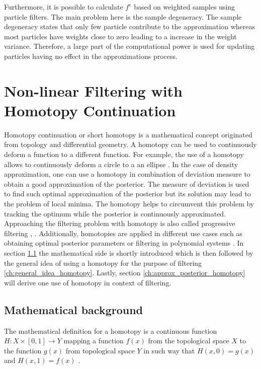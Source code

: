 \documentclass[a4paper]{IEEEtran}
\begin{document}
Furthermore, it is possible to calculate $f^{e}$ based on weighted samples using particle filters. The main problem here is the sample degeneracy. The sample degeneracy states that only few particle contribute to the approximation whereas most particles 
have weights close to zero \cite{arulampalam2002} leading to a increase in the weight variance. Therefore, a large part of the computational power is used for updating particles having no effect in the approximations process.


\section{Non-linear Filtering with Homotopy Continuation}
\label{ch:homotopy_continuation}

Homotopy continuation or short homotopy is a mathematical concept originated from topology and differential geometry. A homotopy can be used to continuously deform a function to a different function. For example, the use of a homotopy allows to continuously deform a
circle to a an ellipse \cite{liao2012}. In the case of density approximation, one can use a homotopy in combination of deviation measure to obtain a good approximation of the posterior. The measure of deviation is used to find such optimal approximation of the posterior but its solution may lead to the problem of local minima.
The homotopy helps to circumvent this problem by tracking the optimum while the posterior is continuously approximated.
Approaching the filtering problem with homotopy is also called progressive filtering \cite{hanebeck2003}, \cite{hanebeck2012a}. Additionally, homotopies are applied in different use cases such as obtaining optimal posterior parameters \cite{hagmar2011} or filtering in polynomial systems \cite{huber}.
In section \ref{ch:math_background_homotopy} the mathematical side is shortly introduced which is then followed by the general idea of using a homotopy for the purpose of filtering \ref{ch:general_idea_homotopy}. 
Lastly, section \ref{ch:approx_posterior_homotopy} will derive one use of homotopy in context of filtering.

\subsection{Mathematical background}
\label{ch:math_background_homotopy}
The mathematical definition for a homotopy is a continuous function $H:X \times [0,1] \rightarrow Y$ mapping a function $f(x)$ from the topological space $X$ to the function $g(x)$ from topological space $Y$ in such way 
that $H(x,0)=g(x)$ and $H(x,1)=f(x)$ \cite{liao2012}. 
\end{document}
